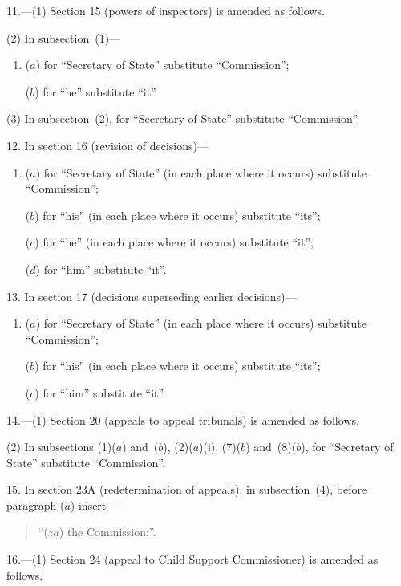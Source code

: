 \documentclass[12pt,a4paper]{article}
\begin{document}
11.---(1) Section 15 (powers of inspectors) is amended as follows.

(2) In subsection~(1)—
\begin{enumerate}\item[]
($a$) for “Secretary of State” substitute “Commission”;

($b$) for “he” substitute “it”.
\end{enumerate}

(3) In subsection~(2), for “Secretary of State” substitute “Commission”.

\medskip

12. In section 16 (revision of decisions)—
\begin{enumerate}\item[]
($a$) for “Secretary of State” (in each place where it occurs) substitute “Commission”;

($b$) for “his” (in each place where it occurs) substitute “its”;

($c$) for “he” (in each place where it occurs) substitute “it”;

($d$) for “him” substitute “it”.
\end{enumerate}

\medskip

13. In section 17 (decisions superseding earlier decisions)—
\begin{enumerate}\item[]
($a$) for “Secretary of State” (in each place where it occurs) substitute “Commission”;

($b$) for “his” (in each place where it occurs) substitute “its”;

($c$) for “him” substitute “it”.
\end{enumerate}

\medskip

14.---(1) Section 20 (appeals to appeal tribunals) is amended as follows.

(2) In subsections (1)($a$) and~($b$), (2)($a$)(i), (7)($b$) and~(8)($b$), for “Secretary of State” substitute “Commission”.

\medskip

15. In section 23A (redetermination of appeals), in subsection~(4), before paragraph ($a$) insert—
\begin{quotation}
“($za$) the Commission;”.
\end{quotation}

\medskip

16.---(1) Section 24 (appeal to Child Support Commissioner) is amended as follows.
\end{document}
